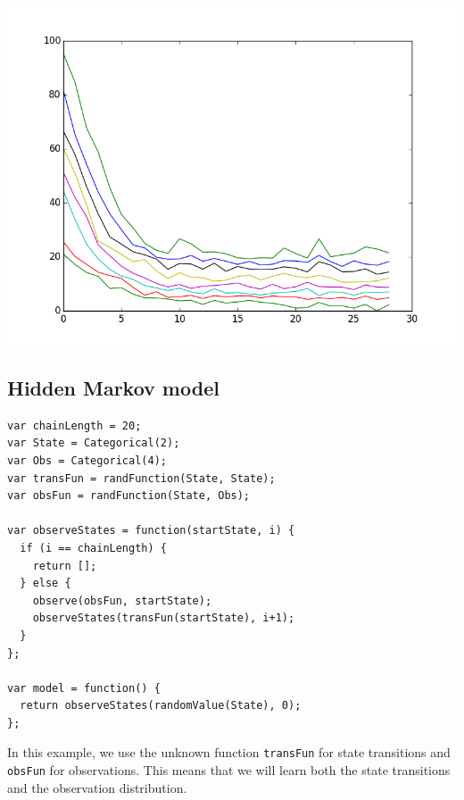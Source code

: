 \documentclass{article}
\begin{document}
\begin{center}
  \includegraphics[scale=0.5]{../plots/accuracy_factor_analysis.png}
\end{center}

  \subsection{Hidden Markov model}
{\small
\begin{lstlisting}
var chainLength = 20;
var State = Categorical(2);
var Obs = Categorical(4);
var transFun = randFunction(State, State);
var obsFun = randFunction(State, Obs);

var observeStates = function(startState, i) {
  if (i == chainLength) {
    return [];
  } else {
    observe(obsFun, startState);
    observeStates(transFun(startState), i+1);
  }
};

var model = function() {
  return observeStates(randomValue(State), 0);
};
\end{lstlisting}
}

In this example, we use the unknown function \texttt{transFun} for state transitions and \texttt{obsFun} for observations.  This means that we will learn both the state transitions and the observation distribution.
\end{document}
